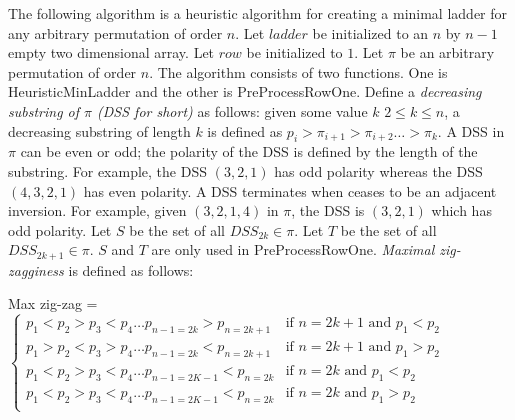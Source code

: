 The following algorithm is a heuristic algorithm for creating a minimal ladder for 
any arbitrary permutation of order $n$. Let $ladder$ be initialized 
to an $n$ by $n-1$ empty two dimensional array. Let $row$ be initialized 
to $1$. Let $\pi$ be an arbitrary permutation of order $n$. The algorithm consists 
of two functions. One is {\sc HeuristicMinLadder} and the other is {\sc PreProcessRowOne}.
Define a \emph{decreasing substring of $\pi$ (DSS for short)}
as follows: given some value $k$ $2 \leq k \leq n$, a decreasing substring of length $k$ is defined as $p_{i}>\pi_{i+1}>\pi_{i+2} \dots > \pi_{k}$.
A DSS in $\pi$ can 
be even or odd; the polarity of the DSS is defined by the length of the substring. For example, 
the DSS $(3,2,1)$ has odd polarity whereas the DSS $(4,3,2,1)$ has even polarity. A DSS terminates when ceases to be an adjacent inversion. 
For example, given $(3,2,1,4)$ in $\pi$, the DSS is $(3,2,1)$ which 
has odd polarity. Let $S$ be the set of all $DSS_{2k} \in \pi$.
Let $T$ be the set of all $DSS_{2k+1} \in \pi$.
$S$ and $T$ are only used in {\sc PreProcessRowOne}.
\emph{Maximal zig-zagginess} is defined as follows:
\begin{small}
\begin{caseof}
    
    Max zig-zag = 
        $\begin{cases}
            p_{1} < p_{2} > p_{3} < p_{4} \dots p_{n-1=2k} > p_{n=2k+1} & \mbox{if } n=2k+1 \mbox{ and } p_{1} < p_{2}\\
            p_{1} > p_{2} < p_{3} > p_{4} \dots  p_{n-1=2k} < p_{n=2k+1} & \mbox{if } n=2k+1 \mbox { and } p_{1} > p_{2}\\ 
            p_{1} < p_{2} > p_{3} < p_{4} \dots p_{n-1=2K-1} < p_{n=2k} & \mbox{if } n=2k \mbox{ and } p_{1} < p_{2}\\ 
            p_{1} < p_{2} > p_{3} < p_{4} \dots p_{n-1=2K-1} < p_{n=2k} & \mbox{if } n=2k \mbox{ and } p_{1} > p_{2}\\
        \end{cases}$
   
\end{caseof}
 \end{small}\pagebreak


